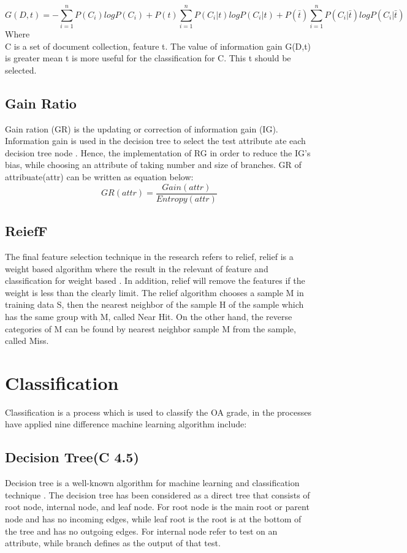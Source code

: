 \documentclass[review]{elsarticle}
\begin{document}
\begin{equation}
G(D,t)=-\sum_{i=1}^nP(C_i)logP(C_i) + P(t)\sum_{i=1}^nP(C_i|t)logP(C_i|t)+P(\bar{t})\sum_{i=1}^nP(C_i|\bar{t})logP(C_i|\bar{t})
\end{equation}
Where\\
 C is a set of document collection, feature t. The value of information gain G(D,t) is greater mean t is more useful for the classification for C. This t should be selected.
 
\subsection{Gain Ratio}
 Gain ration (GR) is the updating or correction of information gain (IG). Information gain is used in the decision tree to select the test attribute ate each decision tree node \cite{Han2012}. Hence, the implementation of RG in order to reduce the IG’s bias, while choosing an attribute of taking number and size of branches.  GR of attribuate(attr) can be written as equation below: 
 \begin{equation}
 GR(attr)=\dfrac{Gain(attr)}{Entropy(attr)}
 \end{equation}
 
 \subsection{ReiefF}
 The final feature selection technique in the research refers to relief, relief is a weight based algorithm where the result in the relevant of feature and classification for weight based \cite{Kira1994}. In addition, relief will remove the features if the weight is less than the clearly limit. The relief algorithm chooses a sample M in training data S, then the nearest neighbor of the sample H of the sample which has the same group with M, called Near Hit. On the other hand, the reverse categories of M can be found by nearest neighbor sample M from the sample, called Miss. 

 
 \section{Classification}
 Classification is a process which is used to classify the OA grade, in the processes have applied nine difference machine learning algorithm include: 

 \subsection{Decision Tree(C 4.5)}
 	Decision tree is a well-known algorithm for machine learning and classification technique \cite{Quinlan1986}.  The decision tree has been considered as a direct tree that consists of root node, internal node, and leaf node. For root node is the main root or parent node and has no incoming edges, while leaf root is the root is at the bottom of the tree and has no outgoing edges. For internal node refer to test on an attribute, while branch defines as the output of that test. 
 
\end{document}
